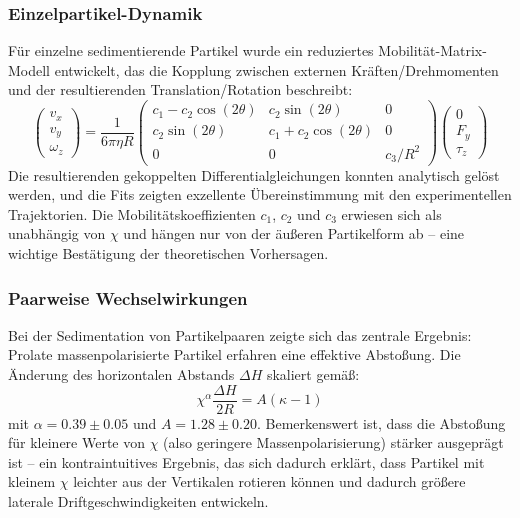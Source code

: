 \documentclass[a4paper,12pt]{article}
\begin{document}
\subsubsection*{Einzelpartikel-Dynamik}
Für einzelne sedimentierende Partikel wurde ein reduziertes Mobilität-Matrix-Modell entwickelt, das die Kopplung zwischen externen Kräften/Drehmomenten und der resultierenden Translation/Rotation beschreibt:
\begin{equation}
\begin{pmatrix} v_x \\ v_y \\ \omega_z \end{pmatrix} = \frac{1}{6\pi\eta R} 
\begin{pmatrix} 
c_1 - c_2\cos(2\theta) & c_2\sin(2\theta) & 0 \\
c_2\sin(2\theta) & c_1 + c_2\cos(2\theta) & 0 \\
0 & 0 & c_3/R^2
\end{pmatrix}
\begin{pmatrix} 0 \\ F_y \\ \tau_z \end{pmatrix}
\end{equation}
Die resultierenden gekoppelten Differentialgleichungen konnten analytisch gelöst werden, und die Fits zeigten exzellente Übereinstimmung mit den experimentellen Trajektorien. Die Mobilitätskoeffizienten $c_1$, $c_2$ und $c_3$ erwiesen sich als unabhängig von $\chi$ und hängen nur von der äußeren Partikelform ab -- eine wichtige Bestätigung der theoretischen Vorhersagen.

\subsubsection*{Paarweise Wechselwirkungen}
Bei der Sedimentation von Partikelpaaren zeigte sich das zentrale Ergebnis: Prolate massenpolarisierte Partikel erfahren eine effektive Abstoßung. Die Änderung des horizontalen Abstands $\Delta H$ skaliert gemäß:
\begin{equation}
\chi^{\alpha} \frac{\Delta H}{2R} = A(\kappa - 1)
\end{equation}
mit $\alpha = 0.39 \pm 0.05$ und $A = 1.28 \pm 0.20$. Bemerkenswert ist, dass die Abstoßung für kleinere Werte von $\chi$ (also geringere Massenpolarisierung) stärker ausgeprägt ist -- ein kontraintuitives Ergebnis, das sich dadurch erklärt, dass Partikel mit kleinem $\chi$ leichter aus der Vertikalen rotieren können und dadurch größere laterale Driftgeschwindigkeiten entwickeln.
\end{document}
